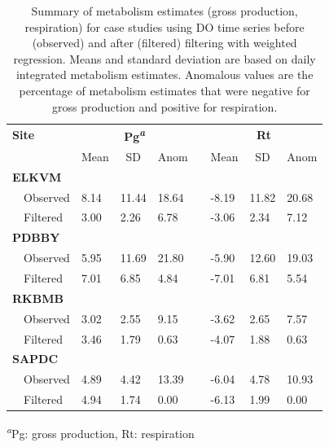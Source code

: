 \documentclass[letterpaper,12pt,oneside]{article}\usepackage[]{graphicx}\usepackage[]{color}
\begin{document}
\begin{table}[!tbp]
\caption{Summary of metabolism estimates (gross production, respiration) for case studies using \ac{DO} time series before (observed) and after (filtered) filtering with weighted regression.  Means and standard deviation are based on daily integrated metabolism estimates.  Anomalous values are the percentage of metabolism estimates that were negative for gross production and positive for respiration.\label{tab:case_res}} 
\begin{center}
\begin{tabular}{llllclll}
\hline\hline
\multicolumn{1}{l}{\bfseries Site}&\multicolumn{3}{c}{\bfseries Pg\textsuperscript{\textit{a}}}&\multicolumn{1}{c}{\bfseries }&\multicolumn{3}{c}{\bfseries Rt}\tabularnewline
\cline{2-4} \cline{6-8}
\multicolumn{1}{l}{}&\multicolumn{1}{c}{Mean}&\multicolumn{1}{c}{SD}&\multicolumn{1}{c}{Anom}&\multicolumn{1}{c}{}&\multicolumn{1}{c}{Mean}&\multicolumn{1}{c}{SD}&\multicolumn{1}{c}{Anom}\tabularnewline
\hline
{\bfseries ELKVM}&&&&&&&\tabularnewline
~~Observed&8.14&11.44&18.64&&-8.19&11.82&20.68\tabularnewline
~~Filtered&3.00& 2.26& 6.78&&-3.06& 2.34& 7.12\tabularnewline
\hline
{\bfseries PDBBY}&&&&&&&\tabularnewline
~~Observed&5.95&11.69&21.80&&-5.90&12.60&19.03\tabularnewline
~~Filtered&7.01& 6.85& 4.84&&-7.01& 6.81& 5.54\tabularnewline
\hline
{\bfseries RKBMB}&&&&&&&\tabularnewline
~~Observed&3.02& 2.55& 9.15&&-3.62& 2.65& 7.57\tabularnewline
~~Filtered&3.46& 1.79& 0.63&&-4.07& 1.88& 0.63\tabularnewline
\hline
{\bfseries SAPDC}&&&&&&&\tabularnewline
~~Observed&4.89& 4.42&13.39&&-6.04& 4.78&10.93\tabularnewline
~~Filtered&4.94& 1.74& 0.00&&-6.13& 1.99& 0.00\tabularnewline
\hline
\end{tabular}\end{center}

\textsuperscript{\textit{a}}Pg: gross production, Rt: respiration\end{table}
\end{document}
